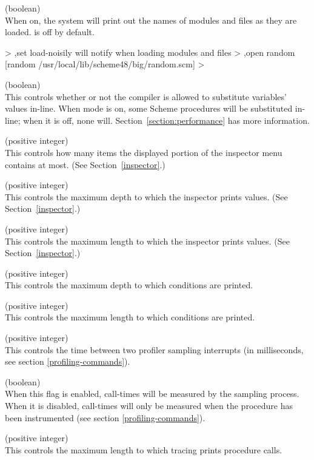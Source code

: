 \begin{description}
\item {} (boolean)\\
    When on, the system will print out the names of modules and files
    as they are loaded.   is off by default.
\begin{example}
> ,set load-noisily
will notify when loading modules and files
> ,open random
[random /usr/local/lib/scheme48/big/random.scm]
> 
\end{example}

\item {} (boolean)\\
This controls whether or not the compiler is allowed to substitute
 variables' values in-line.
When  mode is on,
some Scheme procedures will be substituted in-line; when it is off,
none will.
Section~\ref{section:performance}
has more information.

\item {} (positive integer)\\
This controls how many items the displayed portion of the inspector
menu contains at most.  (See Section~\ref{inspector}.)

\item {} (positive integer)\\
This controls the maximum depth to which the inspector
prints values.  (See Section~\ref{inspector}.)

\item {} (positive integer)\\
This controls the maximum length to which the inspector
prints values.  (See Section~\ref{inspector}.)

\item {} (positive integer)\\
This controls the maximum depth to which conditions
are printed.

\item {} (positive integer)\\
This controls the maximum length to which conditions
are printed.

\item {} (positive integer)\\
This controls the time between two profiler sampling interrupts
(in milliseconds, see section \ref{profiling-commands}).

\item {} (boolean)\\
When this flag is enabled, call-times will be measured by the sampling process.
When it is disabled, call-times will only be measured when the procedure has been
instrumented (see section \ref{profiling-commands}).

\item {} (positive integer)\\
This controls the maximum length to which tracing
prints procedure calls.
\end{description}

